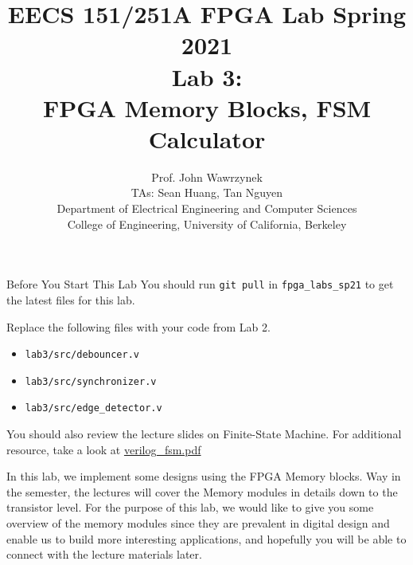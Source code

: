 \documentclass[11pt]{article}
\makeatletter
\renewcommand{\section}
{\@startsection {section}{1}{0pt}
 {-2ex}
 {1ex}
 {\bfseries\Large}}
\makeatother
\begin{document}
\def\PYZsq{\textquotesingle}
\title{\vspace{-0.4in}\Large \bf EECS 151/251A FPGA Lab Spring 2021\\
Lab 3:\\FPGA Memory Blocks, FSM Calculator\vspace{-0.1in}}

\author{Prof. John Wawrzynek \\
TAs: Sean Huang, Tan Nguyen \\ Department of Electrical Engineering and Computer Sciences\\
College of Engineering, University of California, Berkeley}
\date{}
\maketitle

\section{Before You Start This Lab}\label{sec:begin}
You should run \verb|git pull| in \verb|fpga_labs_sp21| to get the latest files for this lab.

Replace the following files with your code from Lab 2.
\begin{itemize}
  \item \verb|lab3/src/debouncer.v|
  \item \verb|lab3/src/synchronizer.v|
  \item \verb|lab3/src/edge_detector.v|
\end{itemize}

You should also review the lecture slides on Finite-State Machine. For additional resource, take a look at \href{http://inst.eecs.berkeley.edu/~eecs151/sp21/files/verilog/verilog\_fsm.pdf}{verilog\_fsm.pdf}


In this lab, we implement some designs using the FPGA Memory blocks. Way in the semester, the lectures will cover the Memory modules in details down to the transistor level. For the purpose of this lab, we would like to give you some overview of the memory modules since they are prevalent in digital design and enable us to build more interesting applications, and hopefully you will be able to connect with the lecture materials later.
\end{document}
